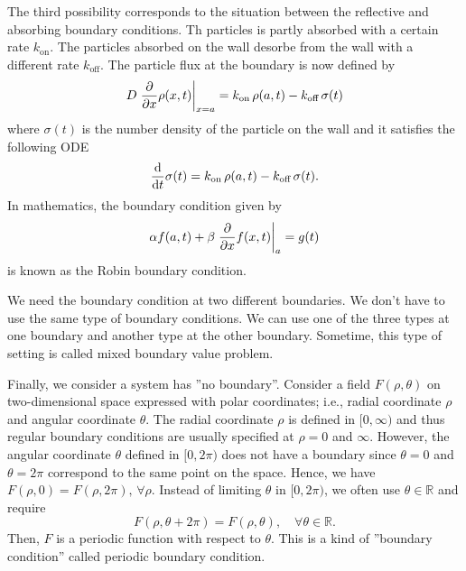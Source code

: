 The third possibility corresponds to the situation between the reflective and absorbing boundary conditions.  Th particles is partly absorbed with a certain rate $k_\text{on}$.   The particles absorbed on the wall desorbe from the wall with a different rate $k_\text{off}$.  The particle flux at the boundary is now defined by
\begin{equation}
D \eval{\pdv{x} \rho(x,t)}_{x=a} = k_\text{on}\, \rho(a,t) - k_\text{off}\, \sigma(t)
\end{equation} 
where $\sigma(t)$ is the number density of the particle on the wall and it satisfies the following ODE
\begin{equation}
\dv{t} \sigma(t) = k_\text{on}\, \rho(a,t) - k_\text{off}\, \sigma(t).
\end{equation}
In mathematics, the boundary condition given by
\begin{equation}\label{eq:pde_robin_boundary}
\alpha f(a,t) + \beta \eval{\pdv{x} f(x,t) }_a = g(t)
\end{equation}
is known as the Robin boundary condition.

We need the boundary condition at two different boundaries.  We don't have to use the same type of boundary conditions.  We can use one of the three types at one boundary and another type at the other boundary.  Sometime, this type of setting is called mixed boundary value problem.

Finally, we consider a system has ''no boundary''.  Consider a field $F(\rho,\theta)$ on two-dimensional space expressed with polar coordinates; i.e., radial coordinate $\rho$ and angular coordinate $\theta$.   The radial coordinate $\rho$ is defined in $[0,\infty)$ and thus regular boundary conditions are usually specified at $\rho=0$ and $\infty$.  However, the angular coordinate $\theta$ defined in $[0, 2\pi)$ does not have a boundary since $\theta=0$ and $\theta=2 \pi$ correspond to the same point on the space.  Hence, we have $F(\rho,0)=F(\rho,2\pi), \, \forall \rho$.
Instead of limiting $\theta$ in $[0, 2\pi)$,  we often use $\theta \in \mathbb{R}$ and require 
\[
F(\rho,\theta+2\pi) = F(\rho,\theta),\quad \forall \theta  \in \mathbb{R}.
\]
Then, $F$ is a periodic function with respect to $\theta$.  This is a kind of ''boundary condition'' called periodic boundary condition.

